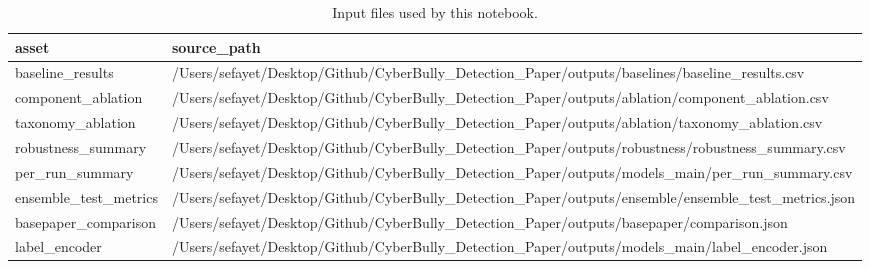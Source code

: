 \begin{table}
\caption{Input files used by this notebook.}
\label{tab:source_audit}
\begin{tabular}{ll}
\toprule
asset & source_path \\
\midrule
baseline_results & /Users/sefayet/Desktop/Github/CyberBully_Detection_Paper/outputs/baselines/baseline_results.csv \\
component_ablation & /Users/sefayet/Desktop/Github/CyberBully_Detection_Paper/outputs/ablation/component_ablation.csv \\
taxonomy_ablation & /Users/sefayet/Desktop/Github/CyberBully_Detection_Paper/outputs/ablation/taxonomy_ablation.csv \\
robustness_summary & /Users/sefayet/Desktop/Github/CyberBully_Detection_Paper/outputs/robustness/robustness_summary.csv \\
per_run_summary & /Users/sefayet/Desktop/Github/CyberBully_Detection_Paper/outputs/models_main/per_run_summary.csv \\
ensemble_test_metrics & /Users/sefayet/Desktop/Github/CyberBully_Detection_Paper/outputs/ensemble/ensemble_test_metrics.json \\
basepaper_comparison & /Users/sefayet/Desktop/Github/CyberBully_Detection_Paper/outputs/basepaper/comparison.json \\
label_encoder & /Users/sefayet/Desktop/Github/CyberBully_Detection_Paper/outputs/models_main/label_encoder.json \\
\bottomrule
\end{tabular}
\end{table}
